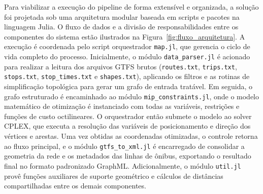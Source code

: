 \documentclass[cic,tc]{infufrgs}
\begin{document}
Para viabilizar a execução do pipeline de forma extensível e organizada, a solução foi projetada sob uma arquitetura modular baseada em scripts e pacotes na linguagem Julia. O fluxo de dados e a divisão de responsabilidades entre os componentes do sistema estão ilustrados na Figura~\ref{fig:fluxo_arquitetura}. A execução é coordenada pelo script orquestrador \texttt{map.jl}, que gerencia o ciclo de vida completo do processo. Inicialmente, o módulo \texttt{data\_parser.jl} é acionado para realizar a leitura dos arquivos GTFS brutos (\texttt{routes.txt}, \texttt{trips.txt}, \texttt{stops.txt}, \texttt{stop\_times.txt} e \texttt{shapes.txt}), aplicando os filtros e as rotinas de simplificação topológica para gerar um grafo de entrada tratável. Em seguida, o grafo estruturado é encaminhado ao módulo \texttt{mip\_constraints.jl}, onde o modelo matemático de otimização é instanciado com todas as variáveis, restrições e funções de custo octilineares. O orquestrador então submete o modelo ao solver CPLEX, que executa a resolução das variáveis de posicionamento e direção dos vértices e arestas. Uma vez obtidas as coordenadas otimizadas, o controle retorna ao fluxo principal, e o módulo \texttt{gtfs\_to\_xml.jl} é encarregado de consolidar a geometria da rede e os metadados das linhas de ônibus, exportando o resultado final no formato padronizado GraphML. Adicionalmente, o módulo \texttt{util.jl} provê funções auxiliares de suporte geométrico e cálculos de distâncias compartilhadas entre os demais componentes.
\end{document}

